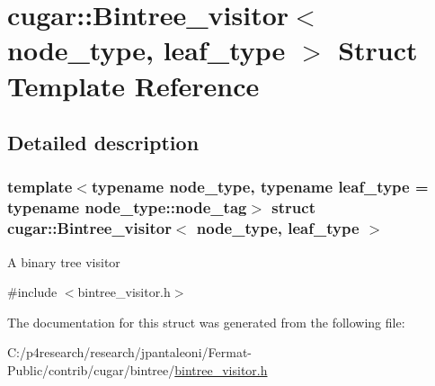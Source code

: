 \hypertarget{structcugar_1_1_bintree__visitor}{}\section{cugar\+:\+:Bintree\+\_\+visitor$<$ node\+\_\+type, leaf\+\_\+type $>$ Struct Template Reference}
\label{structcugar_1_1_bintree__visitor}


\subsection{Detailed description}
\subsubsection*{template$<$typename node\+\_\+type, typename leaf\+\_\+type = typename node\+\_\+type\+::node\+\_\+tag$>$\newline
struct cugar\+::\+Bintree\+\_\+visitor$<$ node\+\_\+type, leaf\+\_\+type $>$}

A binary tree visitor 

{\ttfamily \#include $<$bintree\+\_\+visitor.\+h$>$}



The documentation for this struct was generated from the following file\+:\begin{DoxyCompactItemize}
\item 
C\+:/p4research/research/jpantaleoni/\+Fermat-\/\+Public/contrib/cugar/bintree/\hyperlink{bintree__visitor_8h}{bintree\+\_\+visitor.\+h}\end{DoxyCompactItemize}
